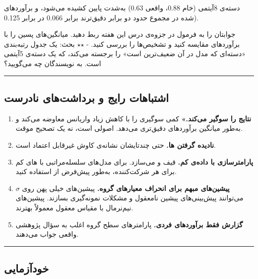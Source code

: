 دسته‌ی 8آیتمی (خام 0.88، واقعی 0.63) به‌شدت پایین کشیده می‌شود، و برآوردهای
شده در مجموع حدود دو برابر دقیق‌ترند  برابر 0.066 در
برابر 0.125).

جوابتان را به فرمول  در جزوه‌ی درس این هفته ربط دهید.
میانگین‌های پسین را با برآوردهای  مقایسه کنید و
تشخیص‌ها را بررسی کنید. - \ensuremath{\star}\ensuremath{\star} بحث: یک جدول رتبه‌بندی «دسته‌ای که مدل 
در آن ضعیف‌ترین است» را برجسته می‌کند، که یک دسته‌ی 5آیتمی است. به
نویسندگان چه می‌گویید؟

\begin{center}\rule{0.5\linewidth}{0.5pt}\end{center}

\subsection{اشتباهات رایج و برداشت‌های نادرست}

\begin{enumerate}
\def\labelenumi{\arabic{enumi}.}
\tightlist
\item
  \textbf{ نتایج را سوگیر می‌کند.»} کمی سوگیری را با کاهش
  زیاد واریانس معاوضه می‌کند و به‌طور میانگین برآوردهای دقیق‌تری می‌دهد.
  اصولی است، نه یک تصحیح موقت.
\item
  \textbf{نادیده گرفتن ها.} حتی چندتایشان نشانه‌ی کاوش
  غیرقابل اعتماد است.
\item
  \textbf{پارامترسازی  با داده‌ی کم.} قیف و 
  می‌سازد. برای مدل‌های سلسله‌مراتبی با های کم برای هر شرکت‌کننده،
  به‌طور پیش‌فرض از  استفاده کنید.
\item
  \textbf{پیشین‌های مبهم برای انحراف معیارهای گروه.} پیشین‌های خیلی پهن
  روی \(\sigma\) می‌توانند پیش‌بینی‌های پیشین نامعقول و مشکلات نمونه‌گیری
  بسازند. پیشین‌های نیم‌نرمال با مقیاس معقول معمولاً بهترند.
\item
  \textbf{گزارش فقط برآوردهای فردی.} پارامترهای سطح گروه اغلب به سؤال
  پژوهشی واقعی جواب می‌دهند.
\end{enumerate}

\begin{center}\rule{0.5\linewidth}{0.5pt}\end{center}

\subsection{خودآزمایی}


